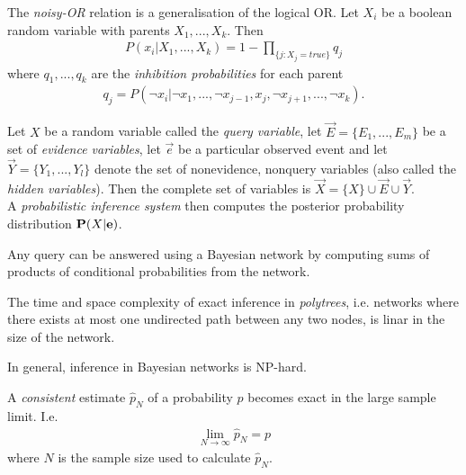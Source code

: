 \documentclass{article}
\begin{document}
\begin{definition}[R\&N p. 518]
    The \emph{noisy-OR} relation is a generalisation of the logical OR. Let $X_i$ be a boolean
    random variable with parents $X_1, ..., X_k$. Then
    \begin{align*}
        P(x_i|X_1, ..., X_k) = 1 - \prod_{\{j:X_j = true\}} q_j
    \end{align*}
    where $q_1,...,q_k$ are the \emph{inhibition probabilities} for each parent
    \begin{align*}
        q_j = P(\neg x_i | \neg x_1, ..., \neg x_{j-1}, x_j, \neg x_{j+1}, ..., \neg x_k).
    \end{align*}
\end{definition}

\begin{definition}[R\&N p. 522]
    Let $X$ be a random variable called the \emph{query variable}, let $\vec E=\{E_1,...,E_m\}$
    be a set of \emph{evidence variables}, let $\vec e$ be a particular observed event and let
    $\vec Y=\{Y_1, ..., Y_l\}$ denote the set of nonevidence, nonquery variables (also
    called the \emph{hidden variables}). Then the complete set of variables is
    $\vec X = \{X\}\cup \vec E \cup \vec Y$.\\
    A \emph{probabilistic inference system} then computes the posterior probability distribution
    $\P(X|\vec e)$.
\end{definition}

\begin{theorem}[R\&N p. 523]
    Any query can be answered using a Bayesian network by computing sums of products of
    conditional probabilities from the network.
\end{theorem}

\begin{theorem}
    The time and space complexity of exact inference in \emph{polytrees}, i.e. networks where there exists at most one
    undirected path between any two nodes, is linar in the size of the network.

    In general, inference in Bayesian networks is NP-hard.
\end{theorem}

\begin{definition}
    A \emph{consistent} estimate $\hat p_N$ of a probability $p$ becomes exact in the large sample limit. I.e. 
    \begin{align*}
        \lim_{N\to\infty} \hat p_N = p
    \end{align*}
    where $N$ is the sample size used to calculate $\hat p_N$.
\end{definition}
\end{document}
